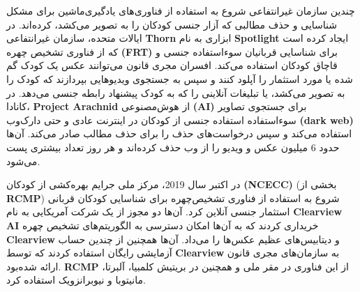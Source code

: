 چندین سازمان غیرانتفاعی شروع به استفاده از فناوری‌های یادگیری‌ماشین برای مشکل شناسایی و حذف مطالبی که آزار جنسی کودکان را به تصویر می‌کشد، کرده‌اند.
در ایالات متحده، سازمان غیرانتفاعی \textenglish{\textbf{Thorn}} ابزاری به نام \textenglish{\textbf{Spotlight}} ایجاد کرده است که از فناوری تشخیص چهره \textenglish{\textbf{(FRT)}} برای شناسایی قربانیان سوء‌استفاده جنسی و قاچاق کودکان استفاده می‌کند.
افسران مجری قانون می‌توانند عکس یک کودک گم شده یا مورد استثمار را آپلود کنند و سپس به جستجوی ویدیوهایی بپردازند که کودک را به تصویر می‌کشد، یا تبلیغات آنلاینی را که به کودک پیشنهاد رابطه جنسی می‌دهد.
در کانادا، \textenglish{\textbf{Project Arachnid}} از هوش‌مصنوعی \textenglish{\textbf{(AI)}} برای جستجوی تصاویر سوءاستفاده استفاده جنسی از کودکان در اینترنت عادی و حتی دارک‌وب \textenglish{\textbf{(dark web)}} استفاده می‌کند و سپس درخواست‌های حذف را برای حذف مطالب صادر می‌کند.
آن‌ها حدود 6 میلیون عکس و ویدیو را از وب حذف کرده‌اند و هر روز تعداد بیشتری پست می‌شود.

در اکتبر سال 2019، مرکز ملی جرایم بهره‌کشی از کودکان \textenglish{\textbf{(NCECC)}} (بخشی از \textenglish{\textbf{RCMP}}) شروع به استفاده از فناوری تشخیص‌چهره برای شناسایی کودکان قربانی استثمار جنسی آنلاین کرد.
آن‌ها دو مجوز از یک شرکت آمریکایی به نام \textenglish{\textbf{Clearview AI}} خریداری کردند که به آن‌ها امکان دسترسی به الگوریتم‌های تشخیص چهره \textenglish{\textbf{Clearview}} و دیتابیس‌های عظیم عکس‌ها را می‌داد.
آن‌ها همچنین از چندین حساب آزمایشی رایگان استفاده کردند که توسط \textenglish{\textbf{Clearview}} به سازمان‌های مجری قانون ارائه شده‌بود.
\textenglish{\textbf{RCMP}} از این فناوری در مقر ملی و همچنین در بریتیش کلمبیا، آلبرتا، مانیتوبا و نیوبرانزویک استفاده کرد.

